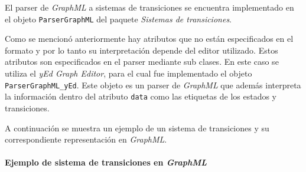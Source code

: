 El parser de \textit{GraphML} a sistemas de transiciones se encuentra implementado en
 el objeto \texttt{ParserGraphML} del paquete \textit{Sistemas de transiciones}.

Como se mencionó anteriormente hay atributos que no están especificados en el formato y
 por lo tanto su interpretación depende del editor utilizado. Estos atributos son especificados
 en el parser mediante sub clases.
En este caso se utiliza el \textit{yEd Graph Editor}, para el cual fue implementado el objeto
 \texttt{ParserGraphML\_yEd}.
Este objeto es un parser de \textit{GraphML} que además interpreta la información dentro del
 atributo \texttt{data} como las etiquetas de los estados y transiciones.

A continuación se muestra un ejemplo de un sistema de transiciones y su correspondiente
 representación en \textit{GraphML}.

\paragraph{Ejemplo de sistema de transiciones en \textit{GraphML}} 


